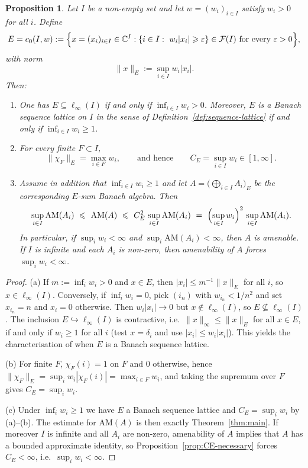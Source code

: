 \documentclass[reqno]{amsart}
\theoremstyle{plain}
\newtheorem{proposition}[theorem]{Proposition}
\theoremstyle{definition}
\theoremstyle{remark}
\newcommand{\AM}{\mathrm{AM}}
\newcommand{\cF}{\mathcal{F}}
\renewcommand{\le}{\leqslant}
\renewcommand{\ge}{\geqslant}
\begin{document}
\begin{proposition}\label{prop:weighted-c0}
Let $I$ be a non-empty set and let $w=(w_i)_{i\in I}$ satisfy $w_i>0$ for all $i$.
Define
\[
E=c_0(I,w):=\Bigl\{x=(x_i)_{i\in I}\in\mathbb{C}^I:
\{i\in I:\ w_i|x_i|\ge \varepsilon\}\in \cF(I)\ \text{for every }\varepsilon>0\Bigr\},
\]
with norm
\[
\|x\|_E:=\sup_{i\in I} w_i|x_i|.
\]
Then:
\begin{enumerate}[label={\rm(\alph*)}]
\item One has $E\subseteq \ell_\infty(I)$ if and only if $\inf_{i\in I} w_i>0$.
Moreover, $E$ is a Banach sequence lattice on $I$ in the sense of
Definition~\ref{def:sequence-lattice} if and only if $\inf_{i\in I} w_i\ge 1$.
\item For every finite $F\subset I$,
\[
\|\chi_F\|_E=\max_{i\in F} w_i,
\qquad\text{and hence}\qquad
C_E=\sup_{i\in I} w_i\in[1,\infty].
\]
\item Assume in addition that $\inf_{i\in I} w_i\ge 1$ and let
\(
A=\bigl(\bigoplus_{i\in I} A_i\bigr)_E
\)
be the corresponding $E$-sum Banach algebra. Then
\[
\sup_{i\in I}\AM(A_i)\ \le\ \AM(A)\ \le\ C_E^2\,\sup_{i\in I}\AM(A_i)
\ =\ \Bigl(\sup_{i\in I} w_i\Bigr)^2\,\sup_{i\in I}\AM(A_i).
\]
In particular, if $\sup_i w_i<\infty$ and $\sup_i\AM(A_i)<\infty$, then $A$ is amenable.
If $I$ is infinite and each $A_i$ is non-zero, then amenability of $A$ forces $\sup_i w_i<\infty$.
\end{enumerate}
\end{proposition}

\begin{proof}
(a) If $m:=\inf_i w_i>0$ and $x\in E$, then $|x_i|\le m^{-1}\|x\|_E$ for all $i$, so $x\in\ell_\infty(I)$.
Conversely, if $\inf_i w_i=0$, pick $(i_n)$ with $w_{i_n}<1/n^2$ and set $x_{i_n}=n$ and $x_i=0$ otherwise.
Then $w_i|x_i|\to 0$ but $x\notin\ell_\infty(I)$, so $E\nsubseteq \ell_\infty(I)$.
The inclusion $E\hookrightarrow\ell_\infty(I)$ is contractive, i.e.\ $\|x\|_\infty\le \|x\|_E$ for all $x\in E$,
if and only if $w_i\ge 1$ for all $i$ (test $x=\delta_i$ and use $|x_i|\le w_i|x_i|$).
This yields the characterisation of when $E$ is a Banach sequence lattice.

(b) For finite $F$, $\chi_F(i)=1$ on $F$ and $0$ otherwise, hence
\(
\|\chi_F\|_E=\sup_i w_i|\chi_F(i)|=\max_{i\in F} w_i
\),
and taking the supremum over $F$ gives $C_E=\sup_i w_i$.

(c) Under $\inf_i w_i\ge 1$ we have $E$ a Banach sequence lattice and $C_E=\sup_i w_i$ by (a)--(b).
The estimate for $\AM(A)$ is then exactly Theorem~\ref{thm:main}.
If moreover $I$ is infinite and all $A_i$ are non-zero, amenability of $A$ implies that $A$ has a bounded approximate identity,
so Proposition~\ref{prop:CE-necessary} forces $C_E<\infty$, i.e.\ $\sup_i w_i<\infty$.
\end{proof}
\end{document}
